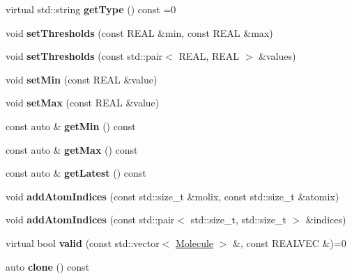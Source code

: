 \begin{DoxyCompactItemize}
\item 
\mbox{\label{classCriterionBase_a7bb6717dc8824634d0c240a077e534ad}} 
virtual std\+::string {\bfseries get\+Type} () const =0
\item 
\mbox{\label{classCriterionBase_af63fcfe2322e6592e1b0c52742c4dd7a}} 
void {\bfseries set\+Thresholds} (const R\+E\+AL \&min, const R\+E\+AL \&max)
\item 
\mbox{\label{classCriterionBase_a74c8a877c6fa8bbb4138fb7ec4c054b3}} 
void {\bfseries set\+Thresholds} (const std\+::pair$<$ R\+E\+AL, R\+E\+AL $>$ \&values)
\item 
\mbox{\label{classCriterionBase_a4253f38d43eb7be87df0743ac2c301d2}} 
void {\bfseries set\+Min} (const R\+E\+AL \&value)
\item 
\mbox{\label{classCriterionBase_a4214c7a2c764495875108414cdacc73f}} 
void {\bfseries set\+Max} (const R\+E\+AL \&value)
\item 
\mbox{\label{classCriterionBase_a6acd9b4ce7906fd35deb7f5716633819}} 
const auto \& {\bfseries get\+Min} () const
\item 
\mbox{\label{classCriterionBase_aafba8d62589c2bcfadf371517697fabf}} 
const auto \& {\bfseries get\+Max} () const
\item 
\mbox{\label{classCriterionBase_a96fea7923df4f65026d2b49d8f2bf0e9}} 
const auto \& {\bfseries get\+Latest} () const
\item 
\mbox{\label{classCriterionBase_ac71ad743b0c0c7fc2b334594b72e35fe}} 
void {\bfseries add\+Atom\+Indices} (const std\+::size\+\_\+t \&molix, const std\+::size\+\_\+t \&atomix)
\item 
\mbox{\label{classCriterionBase_a8112c6b1c6f6b32d5801eb4c1598f4d4}} 
void {\bfseries add\+Atom\+Indices} (const std\+::pair$<$ std\+::size\+\_\+t, std\+::size\+\_\+t $>$ \&indices)
\item 
\mbox{\label{classCriterionBase_a1a3d31560b4f26b7899d366476fe7116}} 
virtual bool {\bfseries valid} (const std\+::vector$<$ \mbox{\hyperlink{classMolecule}{Molecule}} $>$ \&, const R\+E\+A\+L\+V\+EC \&)=0
\item 
\mbox{\label{classCriterionBase_a7b501ade6734a29dd2306d671b6211c3}} 
auto {\bfseries clone} () const
\end{DoxyCompactItemize}
